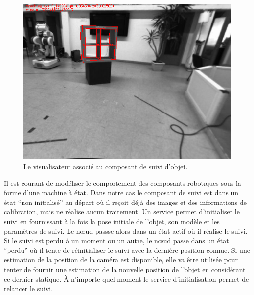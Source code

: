 \begin{figure}
  \begin{center}
    \includegraphics[width=.95\linewidth]{src/chap4-integration/shelf.png}
  \end{center}
  \caption{Le visualisateur associé au composant de suivi d'objet.}
\end{figure}



Il est courant de modéliser le comportement des composants robotiques
sous la forme d'une machine à état. Dans notre cas le composant de
suivi est dans un état ``non initialisé'' au départ où il reçoit déjà
des images et des informations de calibration, mais ne réalise aucun
traitement. Un service permet d'initialiser le suivi en fournissant à
la fois la pose initiale de l'objet, son modèle et les paramètres de
suivi. Le n\oe ud passse alors dans un état actif où il réalise le
suivi. Si le suivi est perdu à un moment ou un autre, le n\oe ud passe
dans un état ``perdu'' où il tente de réinitialiser le suivi avec la
dernière position connue. Si une estimation de la position de la
caméra est disponible, elle va être utilisée pour tenter de fournir
une estimation de la nouvelle position de l'objet en considérant ce
dernier statique. À n'importe quel moment le service d'initialisation
permet de relancer le suivi.


